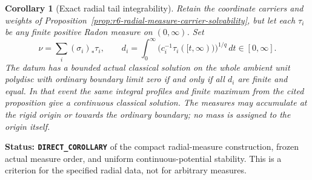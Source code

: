 \documentclass[11pt,a4paper]{article}
\numberwithin{equation}{section}
\newtheorem{corollary}[theorem]{Corollary}
\theoremstyle{definition}
\theoremstyle{remark}
\begin{document}
\begin{corollary}[Exact radial tail integrability]
\label{cor:r6-radial-tail-depth}
Retain the coordinate carriers and weights of
Proposition~\ref{prop:r6-radial-measure-carrier-solvability}, but let
each $\tau_i$ be any finite positive Radon measure on $(0,\infty)$.
Set
\[
 \nu=\sum_i(\sigma_i)_*\tau_i,
 \qquad d_i=\int_0^\infty
       \bigl(c_i^{-1}\tau_i([t,\infty))\bigr)^{1/q}\,dt
                  \in[0,\infty].
\]
The datum has a bounded actual classical solution on the whole
ambient unit polydisc with ordinary boundary limit zero if and
only if all $d_i$ are finite and equal. In that event the same
integral profiles and finite maximum from the cited proposition
give a continuous classical solution. The measures may accumulate
at the rigid origin or towards the ordinary boundary; no mass is
assigned to the origin itself.
\end{corollary}

\noindent\textbf{Status: \texttt{DIRECT\_COROLLARY}} of the
compact radial-measure construction, frozen actual measure order,
and uniform continuous-potential stability. This is a criterion for
the specified radial data, not for arbitrary measures.
\end{document}
